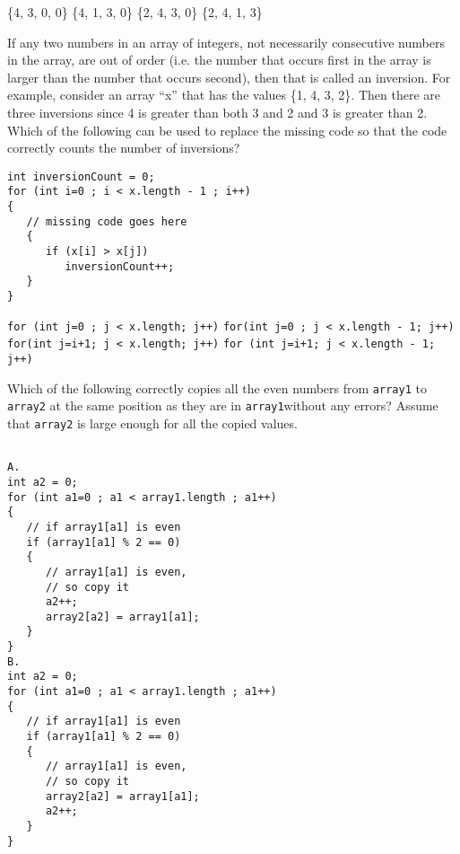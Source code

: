 \documentclass{exam}
\begin{document}
\begin{questions}
\begin{choices}

\choice \{4, 3, 0, 0\}
\choice \{4, 1, 3, 0\}
\choice \{2, 4, 3, 0\}
\choice \{2, 4, 1, 3\}

\end{choices}



\question
 If any two numbers in an array of integers, not necessarily consecutive numbers in the array, are out of order (i.e. the number that occurs first in the array is larger than the number that occurs second), then that is called an inversion. For example, consider an array “x” that has the values \{1, 4, 3, 2\}. Then there are three inversions since 4 is greater than both 3 and 2 and 3 is greater than 2. Which of the following can be used to replace the missing code so that the code correctly counts the number of inversions?

\begin{lstlisting}
int inversionCount = 0;
for (int i=0 ; i < x.length - 1 ; i++)
{
   // missing code goes here
   {
      if (x[i] > x[j])
         inversionCount++;
   }
}

\end{lstlisting}


\begin{choices}
\choice  \texttt{for (int j=0 ; j < x.length; j++)}
\choice  \texttt{for(int j=0 ; j < x.length - 1; j++)}
\choice  \texttt{for(int j=i+1; j < x.length; j++)}
\choice  \texttt{for (int j=i+1; j < x.length - 1; j++)}
\end{choices}

\newpage
\question

 Which of the following correctly copies all the even numbers from \texttt{array1} to \texttt{array2} at the same position as they are in \texttt{array1}without any errors? Assume that \texttt{array2} is large enough for all the copied values.
\begin{multicols}{2}
\begin{lstlisting}

A.
int a2 = 0;
for (int a1=0 ; a1 < array1.length ; a1++)
{
   // if array1[a1] is even
   if (array1[a1] % 2 == 0)
   {
      // array1[a1] is even,
      // so copy it
      a2++;
      array2[a2] = array1[a1];
   }
}
B.
int a2 = 0;
for (int a1=0 ; a1 < array1.length ; a1++)
{
   // if array1[a1] is even
   if (array1[a1] % 2 == 0)
   {
      // array1[a1] is even,
      // so copy it
      array2[a2] = array1[a1];
      a2++;
   }
}
\end{lstlisting}


\end{multicols}
\end{questions}
\end{document}
